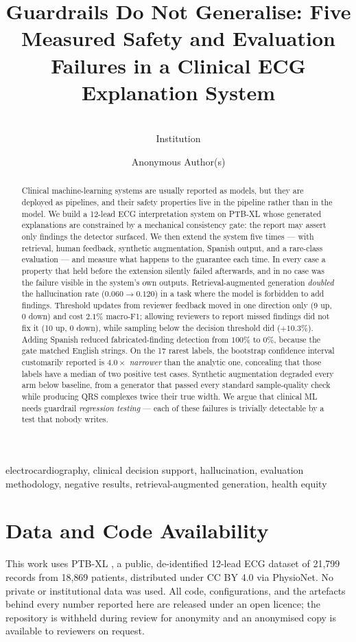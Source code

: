 \documentclass[pmlr,twocolumn,10pt]{jmlr}
\title[Guardrails Do Not Generalise]{Guardrails Do Not Generalise: Five Measured Safety
and Evaluation Failures in a Clinical ECG Explanation System}
\author{\Name{Author Name} \Email{author@institution.edu}\\
  \addr Institution}
\author{Anonymous Author(s)}
\begin{document}
\maketitle

\begin{abstract}
Clinical machine-learning systems are usually reported as models, but they are deployed as
pipelines, and their safety properties live in the pipeline rather than in the model. We
build a 12-lead ECG interpretation system on PTB-XL whose generated explanations are
constrained by a mechanical consistency gate: the report may assert only findings the
detector surfaced. We then extend the system five times --- with retrieval, human feedback,
synthetic augmentation, Spanish output, and a rare-class evaluation --- and measure what
happens to the guarantee each time. In every case a property that held before the extension
silently failed afterwards, and in no case was the failure visible in the system's own
outputs. Retrieval-augmented generation \emph{doubled} the hallucination rate
($0.060 \rightarrow 0.120$) in a task where the model is forbidden to add findings.
Threshold updates from reviewer feedback moved in one direction only (9 up, 0 down) and
cost $2.1\%$ macro-F1; allowing reviewers to report missed findings did not fix it
(10 up, 0 down), while sampling below the decision threshold did ($+10.3\%$). Adding
Spanish reduced fabricated-finding detection from $100\%$ to $0\%$, because the gate matched
English strings. On the 17 rarest labels, the bootstrap confidence interval customarily
reported is $4.0\times$ \emph{narrower} than the analytic one, concealing that those labels
have a median of two positive test cases. Synthetic augmentation degraded every arm below
baseline, from a generator that passed every standard sample-quality check while producing
QRS complexes twice their true width. We argue that clinical ML needs guardrail
\emph{regression testing} --- each of these failures is trivially detectable by a test that
nobody writes.
\end{abstract}

\begin{keywords}
electrocardiography, clinical decision support, hallucination, evaluation methodology,
negative results, retrieval-augmented generation, health equity
\end{keywords}

\section*{Data and Code Availability}
This work uses PTB-XL \citep{wagner2020ptbxl}, a public, de-identified 12-lead ECG dataset
of 21{,}799 records from 18{,}869 patients, distributed under CC BY 4.0 via PhysioNet. No
private or institutional data was used. All code, configurations, and the artefacts behind
every number reported here are released under an open licence; the repository is withheld
during review for anonymity and an anonymised copy is available to reviewers on request.
\end{document}
